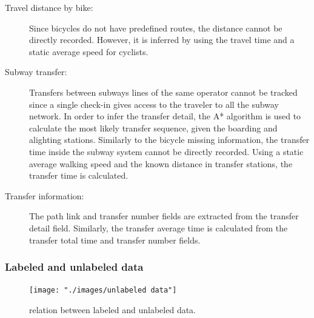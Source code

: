 \documentclass{article}
\begin{document}
\begin{description}%
\item[Travel distance by bike:] Since bicycles do not have predefined routes, the distance cannot be directly recorded. However, it is inferred by using the travel time and a static average speed for cyclists. 

\item[Subway transfer:] Transfers between subways lines of the same operator cannot be tracked since a single check-in gives access to the traveler to all the subway network. In order to infer the transfer detail, the A* algorithm is used to calculate the most likely transfer sequence, given the boarding and alighting stations. 
Similarly to the bicycle missing information, the transfer time inside the subway system cannot be directly recorded. Using a static average walking speed and the known distance in transfer stations, the transfer time is calculated. 

\item[Transfer information:] The path link and transfer number fields are extracted from the transfer detail field. Similarly, the transfer average time is calculated from the transfer total time and transfer number fields. 
\end{description}


\subsubsection{Labeled and unlabeled data}

\begin{figure}[H]
  \centering
  \texttt{[image: "./images/unlabeled data"]}
  \caption{relation between labeled and unlabeled data.}
  \label{fig:method/unlabeled}
\end{figure}
\end{document}

